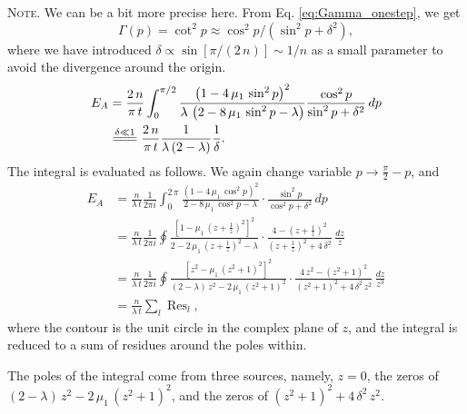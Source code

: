 \documentclass[reprint, floatfix]{revtex4-1}
\newcommand{\note}[1]{{\color{DarkGreen}\footnotesize \textsc{Note.} #1}}
\newcommand{\Err}{E}
\begin{document}
\note{We can be a bit more precise here.
%
From Eq. \eqref{eq:Gamma_onestep}, we get
%
$$
\Gamma(p) = \cot^2 p \approx \cos^2 p / (\sin^2 p + \delta^2),
$$
%
where we have introduced
$\delta \propto \sin[ \pi / (2 \, n) ] \sim 1/n$
as a small parameter to avoid the divergence
around the origin.
%
$$
\begin{aligned}
\Err_A
&=
\frac{   2 \, n }
     { \pi \, t }
\int_0^{\pi/2}
    \frac{            \left(1 - 4 \, \mu_1 \, \sin^2 p \right)^2         }
         { \lambda \, \left(2 - 8 \, \mu_1 \, \sin^2 p - \lambda \right) }
    \frac{ \cos^2 p }
         { \sin^2 p + \delta^2 }
\, dp
\notag \\
&
\stackrel{    \delta \ll 1     }
         { =\joinrel=\joinrel= }
\frac{   2 \, n }
     { \pi \, t }
\frac{             1             }
     {  \lambda \, (2 - \lambda) }
\frac{    1   }
     { \delta }
.
\end{aligned}
$$
The integral is evaluated as follows.
%
We again change variable $p \to \frac{ \pi } { 2 } - p$,
and
$$
\begin{aligned}
\Err_A
&=
\frac{n}{\lambda \, t}
\frac{1}{2 \pi i}
\int_0^{2 \, \pi}
\frac{ \left(1 - 4 \, \mu_1 \, \cos^2 p \right)^2 }
     {       2 - 8 \, \mu_1 \, \cos^2 p - \lambda }
\cdot
\frac{ \sin^2 p            }
     { \cos^2 p + \delta^2 }
\, dp
\\
&=
\frac{n}{\lambda \, t}
\frac{1}{2 \pi i}
\oint
\frac{ \left[1 -      \mu_1 \, \left(z + \frac{1}{z}\right)^2 \right]^2 }
     {       2 - 2 \, \mu_1 \, \left(z + \frac{1}{z}\right)^2 - \lambda }
\cdot
\frac{ 4 - \left( z + \frac 1 z \right)^2 }
     { \left( z + \frac 1 z \right)^2 + 4 \, \delta^2 }
\, \frac{dz}{z}
\\
&=
\frac{n}{\lambda \, t}
\frac{1}{2 \pi i}
\oint
\frac{ \left[z^2 -      \mu_1 \, (z^2 + 1)^2 \right]^2   }
     {  (2 - \lambda) \, z^2 - 2 \, \mu_1 \, (z^2 + 1)^2 }
\cdot
\frac{ 4 \, z^2 - ( z^2 + 1 )^2 }
     { ( z^2 + 1 )^2 + 4 \, \delta^2 \, z^2 }
\, \frac{ dz }{ z^3 }
\\
&=
\frac{ n } { \lambda \, t }
\sum_l \operatorname{Res}_l
,
\end{aligned}
$$
where the contour is the unit circle
in the complex plane of $z$,
and the integral is reduced to a sum of residues
around the poles within.

The poles of the integral come from three sources,
namely,
$z = 0$,
the zeros of
$(2 - \lambda) \, z^2 - 2 \, \mu_1 \, (z^2 + 1)^2$,
and the zeros of
$( z^2 + 1 )^2 + 4 \, \delta^2 \, z^2$.

}
\end{document}
